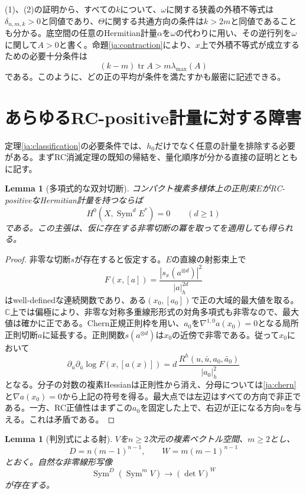 \documentclass[12pt]{amsart}
\newtheorem{lem}[thm]{Lemma}
\theoremstyle{definition}
\theoremstyle{remark}
\numberwithin{equation}{section}
\DeclareMathOperator{\tr}{tr}
\DeclareMathOperator{\Sym}{Sym}
\newcommand{\C}{\mathbb{C}}
\newcommand{\cst}{\delta_{n,m,k}}
\newcommand{\jref}[1]{\eqref{ja:#1}}
\begin{document}
(1)、(2)の証明から、すべての$k$について、$\omega$に関する狭義の外積不等式は$\cst>0$と同値であり、$\Theta$に関する共通方向の条件は$k>2m$と同値であることも分かる。底空間の任意のHermitian計量$\alpha$を$\omega$の代わりに用い、その逆行列を$\omega$に関して$A>0$と書く。命題\ref{ja:contraction}により、$x$上で外積不等式が成立するための必要十分条件は
\begin{equation}\label{ja:allaverages}
(k-m)\tr A>m\lambda_{\max}(A)
\end{equation}
である。このように、どの正の平均が条件を満たすかも厳密に記述できる。

\section{あらゆるRC-positive計量に対する障害}

定理\ref{ja:classification}の必要条件では、$h_0$だけでなく任意の計量を排除する必要がある。まずRC消滅定理の既知の帰結を、量化順序が分かる直接の証明とともに記す。

\begin{lem}[多項式的な双対切断]\label{ja:vanishing}
コンパクト複素多様体上の正則束$E$がRC-positiveなHermitian計量を持つならば
\[
H^0(X,\Sym^d E^*)=0\qquad(d\ge1)
\]
である。この主張は、仮に存在する非零切断の冪を取って\cite[Theorem~1.3]{ja:Y18}を適用しても得られる。
\end{lem}

\begin{proof}
非零な切断$s$が存在すると仮定する。$E$の直線の射影束上で
\[
F(x,[a])=\frac{|s_x(a^{\otimes d})|^2}{|a|_h^{2d}}
\]
はwell-definedな連続関数であり、ある$(x_0,[a_0])$で正の大域的最大値を取る。$\C$上では偏極により、非零な対称多重線形形式の対角多項式も非零なので、最大値は確かに正である。Chern正規正則枠を用い、$a_0$を$\nabla^{1,0}a(x_0)=0$となる局所正則切断$a$に延長する。正則関数$s(a^{\otimes d})$は$x_0$の近傍で非零である。従って$x_0$において
\begin{equation}\label{ja:maxprinciple}
\partial_u\partial_{\bar u}\log F(x,[a(x)])
=d\,\frac{R^h(u,\bar u,a_0,\bar a_0)}{|a_0|_h^2}
\end{equation}
となる。分子の対数の複素Hessianは正則性から消え、分母については\jref{chern}と$\nabla a(x_0)=0$から上記の符号を得る。最大点では左辺はすべての方向で非正である。一方、RC正値性はまずこの$a_0$を固定した上で、右辺が正になる方向$u$を与える。これは矛盾である。
\end{proof}

\begin{lem}[判別式による射]\label{ja:discriminant}
$V$を$n\ge2$次元の複素ベクトル空間、$m\ge2$とし、
\begin{equation}\label{ja:weights}
D=n(m-1)^{n-1},\qquad W=m(m-1)^{n-1}
\end{equation}
とおく。自然な非零線形写像
\begin{equation}\label{ja:discmap}
\Sym^D(\Sym^m V)\longrightarrow(\det V)^W
\end{equation}
が存在する。
\end{lem}
\end{document}
